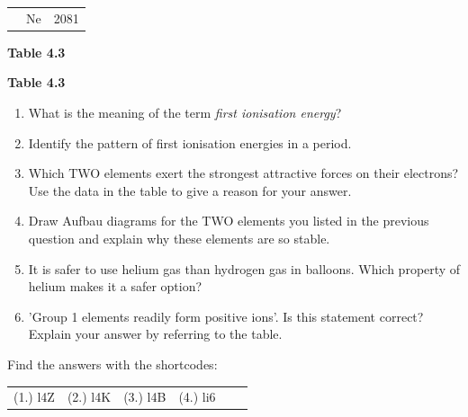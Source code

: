 \begin{enumerate}[noitemsep, label=\textbf{\arabic*}. ]
\begin{table}[H]
\begin{center}
\begin{xtabular}[t]{|l|l|l|}
         &
        $\mathrm{Ne}$ &
        2081%
     \tabularnewline{}
    \end{xtabular}
      \end{center}
    \begin{center}{\small\bfseries Table 4.3}\end{center}
    \begin{caption}{\small\bfseries Table 4.3}\end{caption}
\end{table}
    \par
  \label{m38757*id264201}\begin{enumerate}[noitemsep, label=\textbf{\alph*}. ] 
            \label{m38757*uid223}\item What is the meaning of the term \textsl{first ionisation energy}?
\label{m38757*uid224}\item Identify the pattern of first ionisation energies in a period.
\label{m38757*uid225}\item Which TWO elements exert the strongest attractive forces on their electrons? Use the data in the table to give a reason for your answer.
\label{m38757*uid226}\item Draw Aufbau diagrams for the TWO elements you listed in the previous question and explain why these elements are so stable.
\label{m38757*uid227}\item It is safer to use helium gas than hydrogen gas in balloons. Which property of helium makes it a safer option?
\label{m38757*uid228}\item 'Group 1 elements readily form positive ions'.
Is this statement correct? Explain your answer by referring to the table.
\end{enumerate}
        \end{enumerate}
\label{m38757**end}
  \label{4e3d8e3d8992782b4e5d6fd958df32f9**end}
\par {} Find the answers with the shortcodes:
 \par \begin{tabular}[h]{cccccc}
 (1.) l4Z  &  (2.) l4K  &  (3.) l4B  &  (4.) li6  & \end{tabular}
